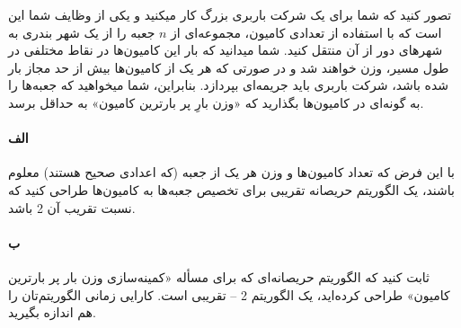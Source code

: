 \documentclass[]{article}
\begin{document}
تصور کنید که شما برای یک شرکت باربری بزرگ کار میکنید و یکی از وظایف شما این است که با استفاده از تعدادی کامیون،
مجموعه‌ای از $n$ جعبه را از یک شهر بندری به شهرهای دور از آن منتقل کنید.
شما میدانید که بار این کامیون‌ها در نقاط مختلفی در طول مسیر، وزن خواهند شد
و در صورتی که هر یک از کامیون‌ها بیش از حد مجاز بار شده باشد،
شرکت باربری باید جریمه‌ای بپردازد.
بنابراین، شما میخواهید که جعبه‌ها را به گونه‌ای در کامیون‌‌ها بگذارید
که «وزن بارِ پر بارترین کامیون» به حداقل برسد.

\paragraph*{الف}
با این فرض که تعداد کامیون‌ها و وزن هر یک از  جعبه (که اعدادی صحیح هستند) معلوم باشند،
یک الگوریتم حریصانه تقریبی برای تخصیص جعبه‌ها به کامیون‌ها طراحی کنید
که نسبت تقریب آن 2 باشد.

\paragraph*{ب}
ثابت کنید که الگوریتم حریصانه‌ای که برای مسأله «کمینه‌سازی وزن بار پر بارترین کامیون»
طراحی کرده‌اید، یک الگوریتم 2 – تقریبی است. کارایی زمانی الگوریتم‌تان را هم اندازه بگیرید.
\end{document}
